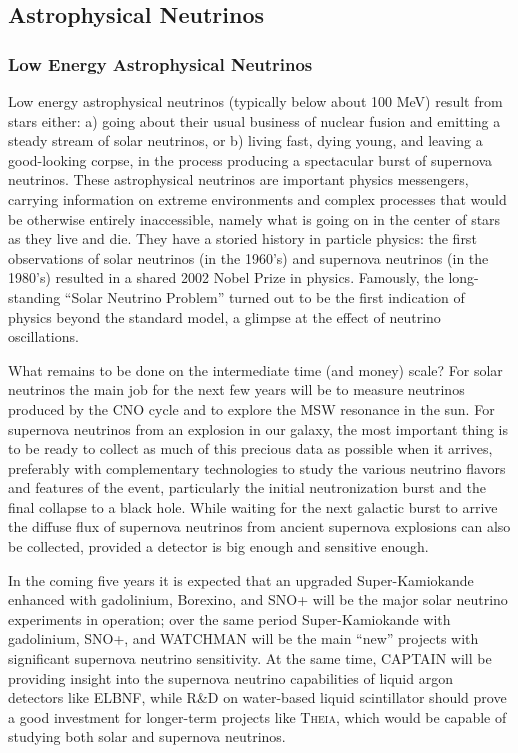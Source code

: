 \subsection{Astrophysical Neutrinos}
\label{sec:Astrophysical}

\subsubsection{Low Energy Astrophysical Neutrinos}
\label{sec:Astrophysical_low}

Low energy astrophysical neutrinos (typically below about 100 MeV)
result from stars either: a) going about their usual business of
nuclear fusion and emitting a steady stream of solar neutrinos, or b)
living fast, dying young, and leaving a good-looking corpse, in the
process producing a spectacular burst of supernova neutrinos. These
astrophysical neutrinos are important physics messengers, carrying
information on extreme environments and complex processes that would
be otherwise entirely inaccessible, namely what is going on in the
center of stars as they live and die. They have a storied history in
particle physics: the first observations of solar neutrinos (in the
1960's) and supernova neutrinos (in the 1980's) resulted in a shared
2002 Nobel Prize in physics. Famously, the long-standing ``Solar
Neutrino Problem'' turned out to be the first indication of physics
beyond the standard model, a glimpse at the effect of neutrino
oscillations.

What remains to be done on the intermediate time (and money) scale?
For solar neutrinos the main job for the next few years will be to
measure neutrinos produced by the CNO cycle and to explore the MSW
resonance in the sun. For supernova neutrinos from an explosion in our
galaxy, the most important thing is to be ready to collect as much of
this precious data as possible when it arrives, preferably with
complementary technologies to study the various neutrino flavors
and features of the event, particularly the initial neutronization
burst and the final collapse to a black hole. While waiting for the
next galactic burst to arrive the diffuse flux of supernova neutrinos
from ancient supernova explosions can also be collected, provided a
detector is big enough and sensitive enough.

In the coming five years it is expected that an upgraded
Super-Kamiokande enhanced with gadolinium, Borexino, and SNO+ will be
the major solar neutrino experiments in operation; over the same
period Super-Kamiokande with gadolinium, SNO+, and WATCHMAN will be
the main ``new'' projects with significant supernova neutrino
sensitivity. At the same time, CAPTAIN will be providing insight into
the supernova neutrino capabilities of liquid argon detectors like
ELBNF, while R\&D on water-based liquid scintillator should prove a
good investment for longer-term projects like \textsc{Theia}, which would be
capable of studying both solar and supernova neutrinos.

